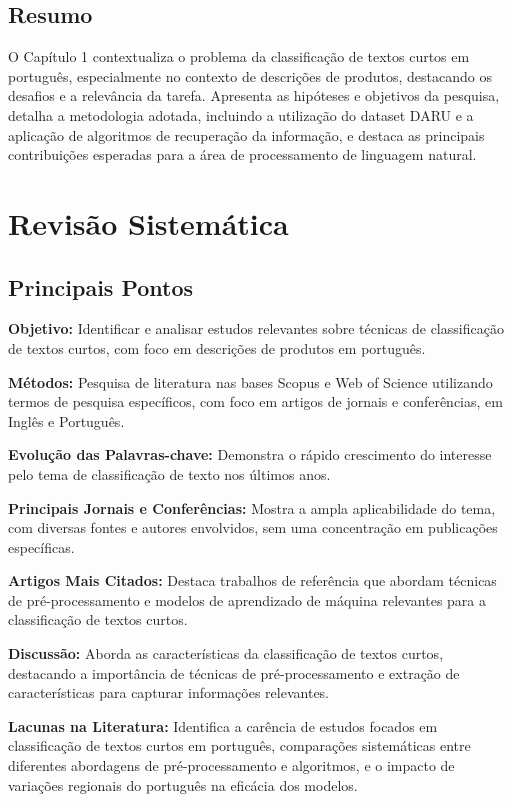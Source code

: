 \documentclass{report}
\begin{document}
\section*{Resumo}

O Capítulo 1 contextualiza o problema da classificação de textos curtos em português, especialmente no contexto de descrições de produtos, destacando os desafios e a relevância da tarefa. Apresenta as hipóteses e objetivos da pesquisa, detalha a metodologia adotada, incluindo a utilização do dataset DARU e a aplicação de algoritmos de recuperação da informação, e destaca as principais contribuições esperadas para a área de processamento de linguagem natural.

\chapter{Revisão Sistemática}

\section*{Principais Pontos}

\textbf{Objetivo:} Identificar e analisar estudos relevantes sobre técnicas de classificação de textos curtos, com foco em descrições de produtos em português.

\textbf{Métodos:} Pesquisa de literatura nas bases Scopus e Web of Science utilizando termos de pesquisa específicos, com foco em artigos de jornais e conferências, em Inglês e Português.

\textbf{Evolução das Palavras-chave:} Demonstra o rápido crescimento do interesse pelo tema de classificação de texto nos últimos anos.

\textbf{Principais Jornais e Conferências:} Mostra a ampla aplicabilidade do tema, com diversas fontes e autores envolvidos, sem uma concentração em publicações específicas.

\textbf{Artigos Mais Citados:} Destaca trabalhos de referência que abordam técnicas de pré-processamento e modelos de aprendizado de máquina relevantes para a classificação de textos curtos.

\textbf{Discussão:} Aborda as características da classificação de textos curtos, destacando a importância de técnicas de pré-processamento e extração de características para capturar informações relevantes.

\textbf{Lacunas na Literatura:} Identifica a carência de estudos focados em classificação de textos curtos em português, comparações sistemáticas entre diferentes abordagens de pré-processamento e algoritmos, e o impacto de variações regionais do português na eficácia dos modelos.
\end{document}
